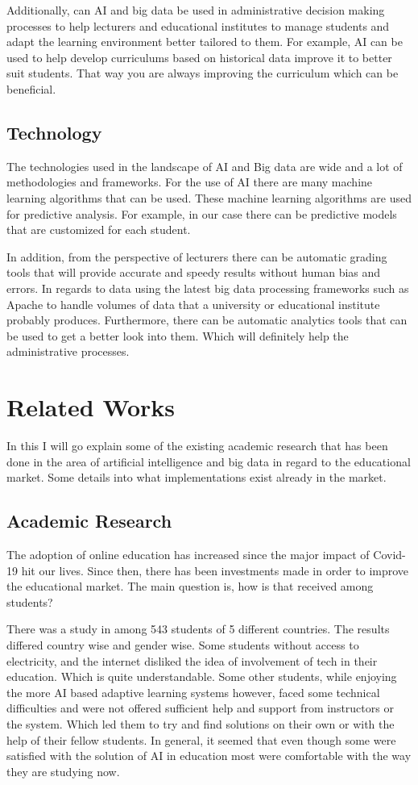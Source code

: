 \documentclass{imc-inf}
\begin{document}
Additionally, can AI and big data be used in administrative decision making processes to help lecturers and educational institutes to manage students and adapt the learning environment better tailored to them. For example, AI can be used to help develop curriculums based on historical data improve it to better suit students. That way you are always improving the curriculum which can be beneficial. 


\section{Technology }
The technologies used in the landscape of AI and Big data are wide and a lot of methodologies and frameworks. For the use of AI there are many machine learning algorithms that can be used. These machine learning algorithms are used for predictive analysis. For example, in our case there can be predictive models that are customized for each student. 

In addition, from the perspective of lecturers there can be automatic grading tools that will provide accurate and speedy results without human bias and errors. In regards to data using the latest big data processing frameworks such as Apache to handle volumes of data that a university or educational institute probably produces. Furthermore, there can be automatic analytics tools that can be used to get a better look into them. Which will definitely help the administrative processes. 




\chapter{Related Works}
In this I will go explain some of the existing academic research that has been done in the area of artificial intelligence and big data in regard to the educational market. Some details into what implementations exist already in the market. 

\section{Academic Research }
The adoption of online education has increased since the major impact of Covid-19 hit our lives. Since then, there has been investments made in order to improve the educational market. The main question is, how is that received among students?

There was a study in \cite{2} among 543 students of 5 different countries. The results differed country wise and gender wise. Some students without access to electricity, and the internet disliked the idea of involvement of tech in their education. Which is quite understandable. Some other students, while enjoying the more AI based adaptive learning systems however, faced some technical difficulties and were not offered sufficient help and support from instructors or the system. Which led them to try and find solutions on their own or with the help of their fellow students. In general, it seemed that even though some were satisfied with the solution of AI in education most were comfortable with the way they are studying now. 
\end{document}
